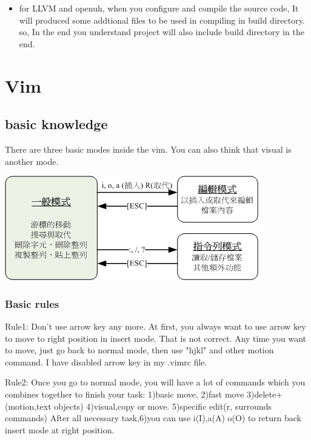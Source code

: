 \documentclass[paper=8.5in:11in, twoside, 12pt, pagesize=pdftex]{book}
\begin{document}
\begin{itemize}
\item for LLVM and openuh, when you configure and compile the source code, It will produced some addtional files to be used in compiling in build directory. so, In the end you understand project will also include build directory in the end. 
\end{itemize}

\fi

	
\chapter{Vim}

\section{basic knowledge}

There are three basic modes inside the vim. You can also think that visual is another mode. 
\begin{center}
	\includegraphics[scale=0.6]{pics/vi-mode} 
\end{center}


\subsection{Basic rules}


Rule1: Don't use arrow key any more. At first, you always want to use arrow key to move to right position in insert mode. That is not correct. Any time you want to move, just go back to normal mode, then use "hjkl" and other motion command. I have disabled arrow key in my .vimrc file.

Rule2: Once you go to normal mode, you will have a lot of commands which you combines together to finish your task: 1)basic move, 2)fast move 3)delete+(motion,text objects) 4)visual,copy or move. 5)specific edit(r, surrounds commands) After all necessary task,6)you can use i(I),a(A) o(O) to return back insert mode at right position.
\end{document}
